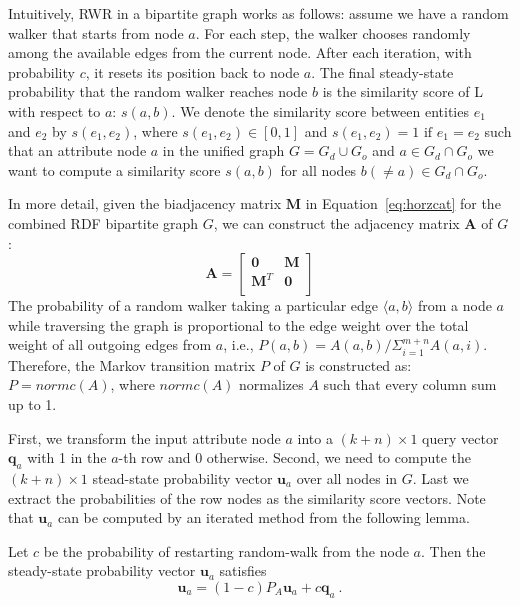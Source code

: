 Intuitively, RWR in a bipartite graph works as follows: assume we have a random walker that starts from node $a$. For each step, the walker chooses randomly among the available edges from the current node. After each iteration, with probability $c$, it resets its position back to node $a$. The final steady-state probability that the random walker reaches node $b$ is the similarity score of L with respect to $a$: $s(a, b)$. We denote the similarity score between entities $e_1$ and $e_2$ by $s(e_1, e_2)$, where $s(e_1,e_2) \in [0, 1]$ and $s(e_1, e_2) = 1 \text{ if } e_1 = e_2$ such that an attribute node $a$ in the unified graph $G = G_d \cup G_o$ and $a \in G_d \cap G_o$ we want to compute a similarity score $s(a, b)$ for all nodes $b(\neq a) \in G_d \cap G_o$.

In more detail, given the biadjacency matrix $\mathbf{M}$ in Equation~\ref{eq:horzcat} for the combined RDF bipartite graph $G$, we can construct the adjacency matrix $\mathbf{A}$ of $G$:
\[
\mathbf{A}=\left[
               \begin{array}{cc}
                 \mathbf{0}   & \mathbf{M} \\
                 \mathbf{M}^T & \mathbf{0} \\
               \end{array}
             \right]
\]
The probability of a random walker taking a particular edge $\langle a,b\rangle$ from a node $a$ while traversing the graph is proportional to the edge weight over the total weight of all outgoing edges from $a$, i.e., $P(a,b)=A(a,b)/\Sigma_{i=1}^{m+n}A(a,i)$. Therefore, the Markov transition matrix $P$ of $G$ is constructed as: $P=normc(A)$, where $normc(A)$ normalizes $A$ such that every column sum up to 1.

First, we transform the input attribute node $a$ into a $(k+n) \times 1$ query vector $\mathbf{q}_a$ with 1 in the $a$-th row and 0 otherwise. Second, we need to compute the $(k+n)\times 1$ stead-state probability vector $\mathbf{u}_a$ over all nodes in $G$. Last we extract the probabilities of the row nodes as the similarity score vectors. Note that $\mathbf{u}_a$ can be computed by an iterated method from the following lemma.

\begin{mylem}\label{lem:pi}
Let $c$ be the probability of restarting random-walk from the node $a$. Then the steady-state probability vector $\mathbf{u}_a$ satisfies
\begin{equation}
\mathbf{u}_a=(1-c)P_A\mathbf{u}_a+c\mathbf{q}_a~.
\end{equation}
\end{mylem}

